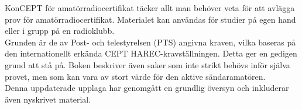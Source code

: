 \newpage
\AddToShipoutPicture*{\BackgroundPicLast}
\color{white}

\noindent KonCEPT för amatörradiocertifikat täcker allt man behöver veta för att
avlägga prov för amatörradiocertifikat. Materialet kan användas för
studier på egen hand eller i grupp på en radioklubb.\\[1ex]

\noindent Grunden är de av Post- och telestyrelsen (PTS) angivna
kraven, vilka baseras på den internationellt erkända CEPT
HAREC-kravställningen. Detta ger en gedigen grund att stå på. Boken
beskriver även saker som inte strikt behövs inför själva provet, men
som kan vara av stort värde för den aktive sändaramatören.\\[1ex]

\noindent Denna uppdaterade upplaga har genomgått en grundlig översyn
och inkluderar även nyskrivet material. \\[1ex]
